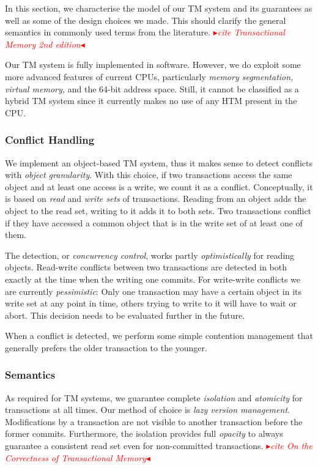 \documentclass{sigplanconf}
\newcommand{\mynote}[2]{%
  \textcolor{red}{%
    \fbox{\bfseries\sffamily\scriptsize#1}%
    {\small$\blacktriangleright$\textsf{\emph{#2}}$\blacktriangleleft$}%
  }%
}
\newcommand\remi[1]{\mynote{Remi}{#1}}
\begin{document}
In this section, we characterise the model of our TM system and its
guarantees as well as some of the design choices we made. This should
clarify the general semantics in commonly used terms from the
literature.\remi{cite Transactional Memory 2nd edition}

Our TM system is fully implemented in software. However, we do exploit
some more advanced features of current CPUs, particularly \emph{memory
segmentation, virtual memory,} and the 64-bit address space. Still,
it cannot be classified as a hybrid TM system since it currently
makes no use of any HTM present in the CPU.

\subsubsection{Conflict Handling}

We implement an object-based TM system, thus it makes sense to detect
conflicts with \emph{object granularity}. With this choice, if two
transactions access the same object and at least one access is a
write, we count it as a conflict. Conceptually, it is based on
\emph{read} and \emph{write sets} of transactions. Reading from an
object adds the object to the read set, writing to it adds it to both
sets. Two transactions conflict if they have accessed a common object
that is in the write set of at least one of them.

The detection, or \emph{concurrency control}, works partly
\emph{optimistically} for reading objects. Read-write conflicts
between two transactions are detected in both exactly at the time when
the writing one commits. For write-write conflicts we are currently
\emph{pessimistic}: Only one transaction may have a certain object in
its write set at any point in time, others trying to write to it will
have to wait or abort. This decision needs to be evaluated further
in the future.

When a conflict is detected, we perform some simple contention
management that generally prefers the older transaction to the younger.

\subsubsection{Semantics}

As required for TM systems, we guarantee complete \emph{isolation} and
\emph{atomicity} for transactions at all times. Our method of choice
is \emph{lazy version management}. Modifications by a transaction are
not visible to another transaction before the former commits.
Furthermore, the isolation provides full \emph{opacity} to always
guarantee a consistent read set even for non-committed transactions.
\remi{cite On the Correctness of Transactional Memory}
\end{document}
